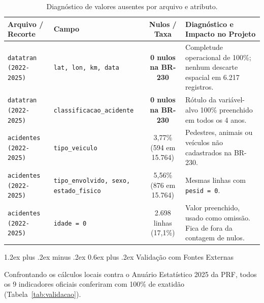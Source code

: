 \documentclass[11pt,a4paper]{article}
\makeatletter
\renewcommand\subsection{
\@startsection{subsection}{2}{0pt}%
{1.2ex plus .2ex minus .2ex}%
{0.6ex plus .2ex}%
{\normalfont\large\bfseries\color{secondary}}
}
\makeatother
\begin{document}
\begin{table}[H]
\centering
\small
\renewcommand{\arraystretch}{1.2}
\caption{Diagnóstico de valores ausentes por arquivo e atributo.}
\label{tab:ausencias}
\begin{tabularx}{\textwidth}{|p{3.5cm}|p{2.8cm}|c|X|}
\hline
\textbf{Arquivo / Recorte} & \textbf{Campo} & \textbf{Nulos / Taxa} & \textbf{Diagnóstico e Impacto no Projeto} \\
\hline
\texttt{datatran (2022-2025)} & \texttt{lat, lon, km, data} & \textbf{0 nulos na BR-230} & Completude operacional de 100\%; nenhum descarte espacial em 6.217 registros. \\
\hline
\texttt{datatran (2022-2025)} & \texttt{classificacao\_acidente} & \textbf{0 nulos na BR-230} & Rótulo da variável-alvo 100\% preenchido em todos os 4 anos. \\
\hline
\texttt{acidentes (2022-2025)} & \texttt{tipo\_veiculo} & 3,77\% (594 em 15.764) & Pedestres, animais ou veículos não cadastrados na BR-230. \\
\hline
\texttt{acidentes (2022-2025)} & \texttt{tipo\_envolvido, sexo, estado\_fisico} & 5,56\% (876 em 15.764) & Mesmas linhas com \texttt{pesid = 0}. \\
\hline
\texttt{acidentes (2022-2025)} & \texttt{idade = 0} & 2.698 linhas (17,1\%) & Valor preenchido, usado como omissão. Fica de fora da contagem de nulos. \\
\hline
\end{tabularx}
\end{table}

\subsection{Validação com Fontes Externas}

Confrontando os cálculos locais contra o Anuário Estatístico 2025 da PRF, todos os 9 indicadores oficiais conferiram com 100\% de exatidão (Tabela~\ref{tab:validacao}).
\end{document}
